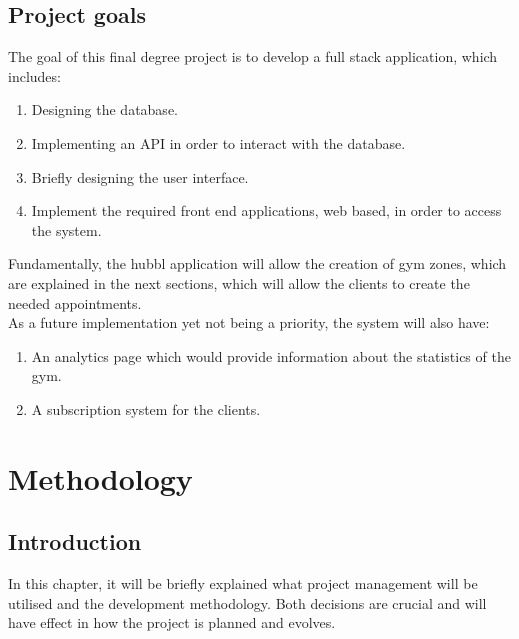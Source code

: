 \documentclass[a4paper, 12pt, oneside]{book}
\begin{document}
\section{Project goals}
The goal of this final degree project is to develop a full stack application, which includes:
\begin{enumerate}[label = -]
	\item Designing the database.
	\item Implementing an API in order to interact with the database.
	\item Briefly designing the user interface.
	\item Implement the required front end applications, web based, in order to access the system.
\end{enumerate}
Fundamentally, the hubbl application will allow the creation of gym zones, which are explained in the next sections, which will allow the clients to create the needed appointments.
\\[8pt]
As a future implementation yet not being a priority, the system will also have:
\begin{enumerate}[label = -]
	\item An analytics page which would provide information about the statistics of the gym.
	\item A subscription system for the clients.
\end{enumerate}
\chapter{Methodology}
\section{Introduction}
In this chapter, it will be briefly explained what project management will be utilised and the development methodology. Both decisions are crucial and will have effect in how the project is planned and evolves.
\end{document}
